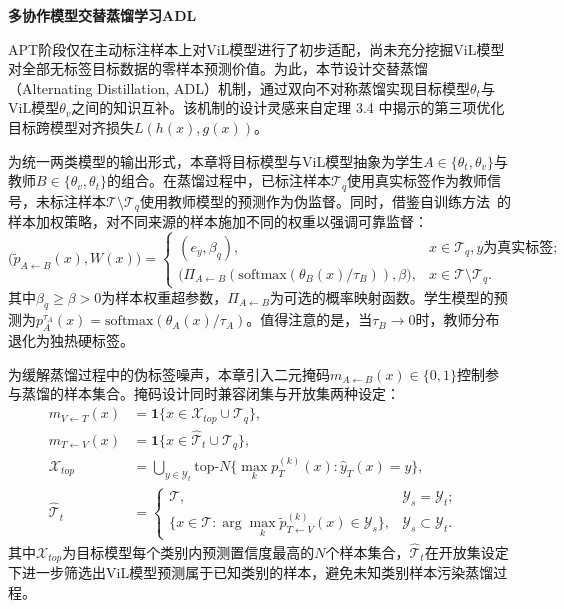 \noindent\textbf{多协作模型交替蒸馏学习ADL}

APT阶段仅在主动标注样本上对ViL模型进行了初步适配，尚未充分挖掘ViL模型对全部无标签目标数据的零样本预测价值。为此，本节设计交替蒸馏（Alternating Distillation, ADL）机制，通过双向不对称蒸馏实现目标模型$\theta_t$与ViL模型$\theta_v$之间的知识互补。该机制的设计灵感来自定理 3.4 中揭示的第三项优化目标跨模型对齐损失$L(h(x),g(x))$。

为统一两类模型的输出形式，本章将目标模型与ViL模型抽象为学生$A\in\{\theta_t,\theta_v\}$与教师$B\in\{\theta_v,\theta_t\}$的组合。在蒸馏过程中，已标注样本$\mathcal{T}_q$使用真实标签作为教师信号，未标注样本$\mathcal{T}\setminus\mathcal{T}_q$使用教师模型的预测作为伪监督。同时，借鉴自训练方法~\cite{liang2021source}的样本加权策略，对不同来源的样本施加不同的权重以强调可靠监督：
\begin{equation}
\big(\tilde{p}_{A\leftarrow B}(x), W(x)\big) =
\begin{cases}
(e_y, \beta_q), & x\in\mathcal{T}_q, y\text{为真实标签};\\
\big(\Pi_{A\leftarrow B}(\mathrm{softmax}(\theta_B(x)/\tau_B)), \beta\big), & x\in\mathcal{T}\setminus\mathcal{T}_q.
\end{cases}
\label{eq:teacher_dist}
\end{equation}
其中$\beta_q\geq\beta>0$为样本权重超参数，$\Pi_{A\leftarrow B}$为可选的概率映射函数。学生模型的预测为$p_A^{\tau_A}(x)=\mathrm{softmax}(\theta_A(x)/\tau_A)$。值得注意的是，当$\tau_B\to 0$时，教师分布退化为独热硬标签。

为缓解蒸馏过程中的伪标签噪声，本章引入二元掩码$m_{A\leftarrow B}(x)\in\{0,1\}$控制参与蒸馏的样本集合。掩码设计同时兼容闭集与开放集两种设定：
\begin{align}
m_{V\leftarrow T}(x) &= \mathbf{1}\{x\in\mathcal{X}_{top}\cup\mathcal{T}_q\}, &\\
m_{T\leftarrow V}(x) &= \mathbf{1}\{x\in\hat{\mathcal{T}}_t\cup\mathcal{T}_q\}, &\\[3pt]
\mathcal{X}_{top} &= \bigcup_{y\in\mathcal{Y}_t}\mathrm{top}\text{-}N\big\{\max_k p_T^{(k)}(x) : \hat{y}_T(x)=y\big\}, \label{eq:topX} &\\[3pt]
\hat{\mathcal{T}}_t &=
\begin{cases}
\mathcal{T}, & \mathcal{Y}_s=\mathcal{Y}_t;\\
\{x\in\mathcal{T}: \arg\max_k\tilde{p}_{T\leftarrow V}^{(k)}(x)\in\mathcal{Y}_s\}, & \mathcal{Y}_s\subset\mathcal{Y}_t.
\end{cases}
\end{align}
其中$\mathcal{X}_{top}$为目标模型每个类别内预测置信度最高的$N$个样本集合，$\hat{\mathcal{T}}_t$在开放集设定下进一步筛选出ViL模型预测属于已知类别的样本，避免未知类别样本污染蒸馏过程。


